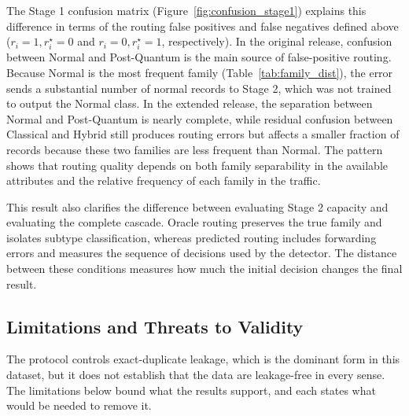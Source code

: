 \documentclass{IEEEoj}
\begin{document}
The Stage 1 confusion matrix (Figure~\ref{fig:confusion_stage1}) explains this difference in terms of the routing false positives and false negatives defined above ($r_i=1, r_i^{\star}=0$ and $r_i=0, r_i^{\star}=1$, respectively). In the original release, confusion between Normal and Post-Quantum is the main source of false-positive routing. Because Normal is the most frequent family (Table~\ref{tab:family_dist}), the error sends a substantial number of normal records to Stage 2, which was not trained to output the Normal class. In the extended release, the separation between Normal and Post-Quantum is nearly complete, while residual confusion between Classical and Hybrid still produces routing errors but affects a smaller fraction of records because these two families are less frequent than Normal. The pattern shows that routing quality depends on both family separability in the available attributes and the relative frequency of each family in the traffic.

This result also clarifies the difference between evaluating Stage 2 capacity and evaluating the complete cascade. Oracle routing preserves the true family and isolates subtype classification, whereas predicted routing includes forwarding errors and measures the sequence of decisions used by the detector. The distance between these conditions measures how much the initial decision changes the final result.

\subsection{Limitations and Threats to Validity}
The protocol controls exact-duplicate leakage, which is the dominant form in this dataset, but it does not establish that the data are leakage-free in every sense. The limitations below bound what the results support, and each states what would be needed to remove it.
\end{document}
